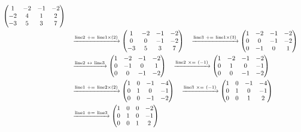 \documentclass{ltjsarticle}
\begin{document}
\begin{align*}
\begin{pmatrix}
 1 & - 2 & -1 & - 2\\
 - 2 & 4 & 1 & 2\\
 - 3 & 5 & 3 & 7
\end{pmatrix}\allowdisplaybreaks\\
&\ \ \ \xrightarrow{ \text{line} 2 \ +=\  \text{line} 1 \times\left( 2 \right)} %
\begin{pmatrix}
 1 & - 2 & -1 & - 2\\
 0 & 0 & -1 & - 2\\
 - 3 & 5 & 3 & 7
\end{pmatrix}\ \ \ \xrightarrow{ \text{line} 3 \ +=\  \text{line} 1 \times\left( 3 \right)} %
\begin{pmatrix}
 1 & - 2 & -1 & - 2\\
 0 & 0 & -1 & - 2\\
 0 & -1 & 0 & 1
\end{pmatrix}\allowdisplaybreaks\\
&\ \ \ \xrightarrow{ \text{line} 2 \ \leftrightarrow\  \text{line} 3 } %
\begin{pmatrix}
 1 & - 2 & -1 & - 2\\
 0 & -1 & 0 & 1\\
 0 & 0 & -1 & - 2
\end{pmatrix}\ \ \ \xrightarrow{ \text{line} 2 \ \times=\ \left( - 1 \right)} %
\begin{pmatrix}
 1 & - 2 & -1 & - 2\\
 0 & 1 & 0 & -1\\
 0 & 0 & -1 & - 2
\end{pmatrix}\allowdisplaybreaks\\
&\ \ \ \xrightarrow{ \text{line} 1 \ +=\  \text{line} 2 \times\left( 2 \right)} %
\begin{pmatrix}
 1 & 0 & -1 & - 4\\
 0 & 1 & 0 & -1\\
 0 & 0 & -1 & - 2
\end{pmatrix}\ \ \ \xrightarrow{ \text{line} 3 \ \times=\ \left( - 1 \right)} %
\begin{pmatrix}
 1 & 0 & -1 & - 4\\
 0 & 1 & 0 & -1\\
 0 & 0 & 1 & 2
\end{pmatrix}\allowdisplaybreaks\\
&\ \ \ \xrightarrow{ \text{line} 1 \ +=\  \text{line} 3 } %
\begin{pmatrix}
 1 & 0 & 0 & - 2\\
 0 & 1 & 0 & -1\\
 0 & 0 & 1 & 2
\end{pmatrix}
\end{align*}
\end{document}
